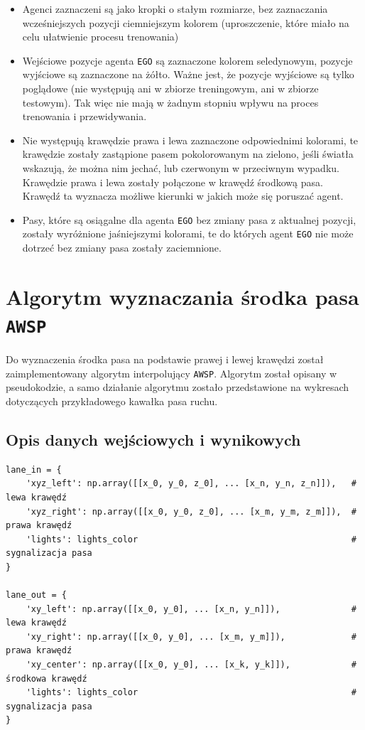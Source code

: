 \begin{itemize}
    \item Agenci zaznaczeni są jako kropki o stałym rozmiarze, bez zaznaczania wcześniejszych pozycji ciemniejszym kolorem (uproszczenie, które miało na celu ułatwienie procesu trenowania)
    \item Wejściowe pozycje agenta \texttt{EGO} są zaznaczone kolorem seledynowym, pozycje wyjściowe są zaznaczone na żółto. Ważne jest, że pozycje wyjściowe są tylko poglądowe (nie występują ani w zbiorze treningowym, ani w zbiorze testowym). Tak więc nie mają w żadnym stopniu wpływu na proces trenowania i przewidywania.
    \item Nie występują krawędzie prawa i lewa zaznaczone odpowiednimi kolorami, te krawędzie zostały zastąpione pasem pokolorowanym na zielono, jeśli światła wskazują, że można nim jechać, lub czerwonym w przeciwnym wypadku. Krawędzie prawa i lewa zostały połączone w krawędź środkową pasa. Krawędź ta wyznacza możliwe kierunki w jakich może się poruszać agent.
    \item Pasy, które są osiągalne dla agenta \texttt{EGO} bez zmiany pasa z aktualnej pozycji, zostały wyróżnione jaśniejszymi kolorami, te do których agent \texttt{EGO} nie może dotrzeć bez zmiany pasa zostały zaciemnione.
\end{itemize}

\newpage

\section{Algorytm wyznaczania środka pasa \texttt{AWSP}}

Do wyznaczenia środka pasa na podstawie prawej i lewej krawędzi został zaimplementowany algorytm interpolujący \texttt{AWSP}. Algorytm został opisany w pseudokodzie, a samo działanie algorytmu zostało przedstawione na wykresach dotyczących przykładowego kawałka pasa ruchu.

\subsection{Opis danych wejściowych i wynikowych}

\vspace{0em}
\begin{verbatim}
lane_in = {
    'xyz_left': np.array([[x_0, y_0, z_0], ... [x_n, y_n, z_n]]),   # lewa krawędź
    'xyz_right': np.array([[x_0, y_0, z_0], ... [x_m, y_m, z_m]]),  # prawa krawędź
    'lights': lights_color                                          # sygnalizacja pasa
}

lane_out = {
    'xy_left': np.array([[x_0, y_0], ... [x_n, y_n]]),              # lewa krawędź
    'xy_right': np.array([[x_0, y_0], ... [x_m, y_m]]),             # prawa krawędź
    'xy_center': np.array([[x_0, y_0], ... [x_k, y_k]]),            # środkowa krawędź
    'lights': lights_color                                          # sygnalizacja pasa
}
\end{verbatim}

